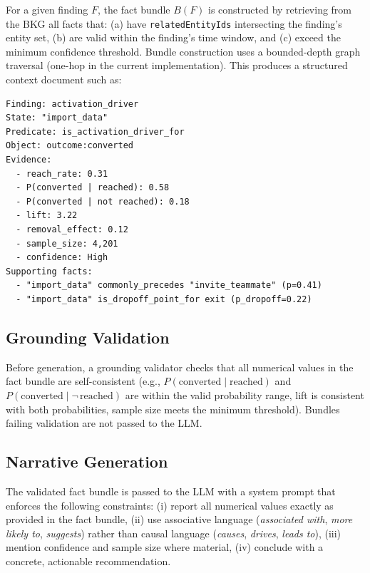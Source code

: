 \documentclass[12pt, a4paper]{article}
\begin{document}
For a given finding $F$, the fact bundle $B(F)$ is constructed by retrieving from the BKG all facts that: (a) have \texttt{relatedEntityIds} intersecting the finding's entity set, (b) are valid within the finding's time window, and (c) exceed the minimum confidence threshold. Bundle construction uses a bounded-depth graph traversal (one-hop in the current implementation). This produces a structured context document such as:

\begin{minipage}{\linewidth}
\begin{lstlisting}
Finding: activation_driver
State: "import_data"
Predicate: is_activation_driver_for
Object: outcome:converted
Evidence:
  - reach_rate: 0.31
  - P(converted | reached): 0.58
  - P(converted | not reached): 0.18
  - lift: 3.22
  - removal_effect: 0.12
  - sample_size: 4,201
  - confidence: High
Supporting facts:
  - "import_data" commonly_precedes "invite_teammate" (p=0.41)
  - "import_data" is_dropoff_point_for exit (p_dropoff=0.22)
\end{lstlisting}
\end{minipage}

\subsection{Grounding Validation}

Before generation, a grounding validator checks that all numerical values in the fact bundle are self-consistent (e.g., $P(\text{converted} \mid \text{reached})$ and $P(\text{converted} \mid \neg\,\text{reached})$ are within the valid probability range, lift is consistent with both probabilities, sample size meets the minimum threshold). Bundles failing validation are not passed to the LLM.

\subsection{Narrative Generation}

The validated fact bundle is passed to the LLM with a system prompt that enforces the following constraints: (i) report all numerical values exactly as provided in the fact bundle, (ii) use associative language (\textit{associated with}, \textit{more likely to}, \textit{suggests}) rather than causal language (\textit{causes}, \textit{drives}, \textit{leads to}), (iii) mention confidence and sample size where material, (iv) conclude with a concrete, actionable recommendation.
\end{document}
